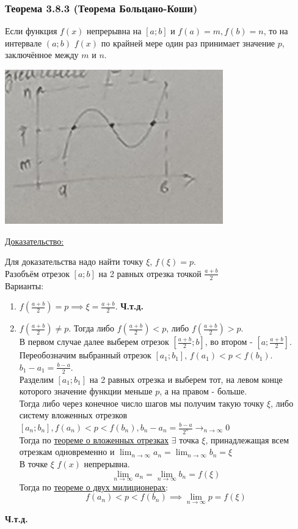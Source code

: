 \documentclass[12pt]{article}
\begin{document}
    \subsubsection*{Теорема 3.8.3 (Теорема Больцано-Коши)}\label{th:3.8.3}
    Если функция $f(x)$ непрерывна на $[a; b]$ и $f(a) = m, f(b) = n$, то на интервале $(a; b)$ $f(x)$ по крайней мере один раз принимает значение $p$, заключённое между $m$ и $n$.
    \begin{center}
        \includegraphics{3.8.1}
    \end{center}
    \underline{Доказательство:}
    \begin{adjustwidth}{1.5em}{1.5em}
        Для доказательства надо найти точку $\xi$, $f(\xi) = p$.\\
        Разобъём отрезок $[a; b]$ на 2 равных отрезка точкой $\frac{a + b}{2}$\\
        Варианты:
        \begin{enumerate}
            \item $f(\frac{a+b}{2}) = p \implies \xi = \frac{a+b}{2}$. \textbf{Ч.т.д.}
            \item $f(\frac{a+b}{2}) \ne p$. Тогда либо $f(\frac{a+b}{2}) < p$, либо $f(\frac{a+b}{2}) > p$.\\
            В первом случае далее выберем отрезок $[\frac{a+b}{2}; b]$, во втором - $[a; \frac{a+b}{2}]$. Переобозначим выбранный отрезок $[a_1; b_1]$, $f(a_1) < p < f(b_1)$. $b_1 - a_1 = \frac{b-a}{2}$.\\
            Разделим $[a_1; b_1]$ на 2 равных отрезка и выберем тот, на левом конце которого значение функции меньше $p$, а на правом - больше.\\
            Тогда либо через конечное число шагов мы получим такую точку $\xi$, либо систему вложенных отрезков $[a_n; b_n], f(a_n) < p < f(b_n), b_n - a_n = \frac{b-a}{2^n} \to_{n \to \infty} 0$\\
            Тогда по \hyperref[th:2.7.1]{теореме о вложенных отрезках} $\exists$ точка $\xi$, принадлежащая всем отрезкам одновременно и $\lim_{n\to\infty}a_n = \lim_{n\to\infty} b_n = \xi$\\
            В точке $\xi$ $f(x)$ непрерывна.
            \[ \lim_{n\to\infty}a_n = \lim_{n\to\infty}b_n = f(\xi) \]
            Тогда по \hyperref[th:2.2.5]{теореме о двух милиционерах}:
            \[ f(a_n) < p < f(b_n) \implies \lim_{n\to\infty}p = f(\xi) \]
        \end{enumerate}
        \begin{center}
            \textbf{Ч.т.д.}
        \end{center}
    \end{adjustwidth}
\end{document}

